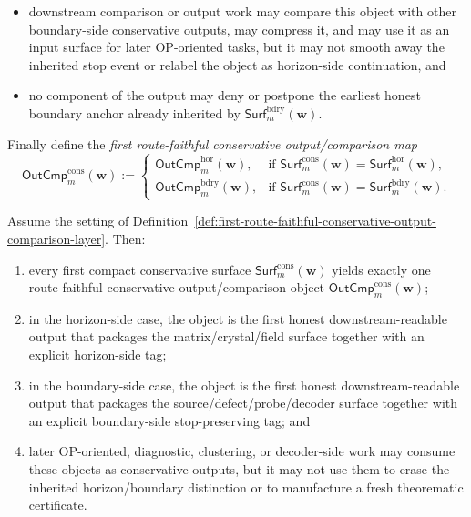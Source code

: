 \begin{definition}
\begin{enumerate}[label=(\roman*)]
\begin{itemize}[leftmargin=2em]
    \item downstream comparison or output work may compare this object with other boundary-side conservative outputs, may compress it, and may use it as an input surface for later OP-oriented tasks, but it may not smooth away the inherited stop event or relabel the object as horizon-side continuation, and
    \item no component of the output may deny or postpone the earliest honest boundary anchor already inherited by \(\mathsf{Surf}^{\mathrm{bdry}}_{m}(\mathbf w)\).
  \end{itemize}
\end{enumerate}
Finally define the \emph{first route-faithful conservative output/comparison map}
\[
  \mathsf{OutCmp}^{\mathrm{cons}}_{m}(\mathbf w)
  :=
  \begin{cases}
    \mathsf{OutCmp}^{\mathrm{hor}}_{m}(\mathbf w), & \text{if }\mathsf{Surf}^{\mathrm{cons}}_{m}(\mathbf w)=\mathsf{Surf}^{\mathrm{hor}}_{m}(\mathbf w),\\[2mm]
    \mathsf{OutCmp}^{\mathrm{bdry}}_{m}(\mathbf w), & \text{if }\mathsf{Surf}^{\mathrm{cons}}_{m}(\mathbf w)=\mathsf{Surf}^{\mathrm{bdry}}_{m}(\mathbf w).
  \end{cases}
\]
\end{definition}

\begin{proposition}
\label{prop:every-first-compact-conservative-surface-yields-exactly-one-route-faithful-conservative-output-comparison-object}
Assume the setting of Definition~\ref{def:first-route-faithful-conservative-output-comparison-layer}. Then:
\begin{enumerate}[label=(\roman*)]
  \item every first compact conservative surface \(\mathsf{Surf}^{\mathrm{cons}}_{m}(\mathbf w)\) yields exactly one route-faithful conservative output/comparison object \(\mathsf{OutCmp}^{\mathrm{cons}}_{m}(\mathbf w)\);
  \item in the horizon-side case, the object is the first honest downstream-readable output that packages the matrix/crystal/field surface together with an explicit horizon-side tag;
  \item in the boundary-side case, the object is the first honest downstream-readable output that packages the source/defect/probe/decoder surface together with an explicit boundary-side stop-preserving tag; and
  \item later OP-oriented, diagnostic, clustering, or decoder-side work may consume these objects as conservative outputs, but it may not use them to erase the inherited horizon/boundary distinction or to manufacture a fresh theorematic certificate.
\end{enumerate}
\end{proposition}

